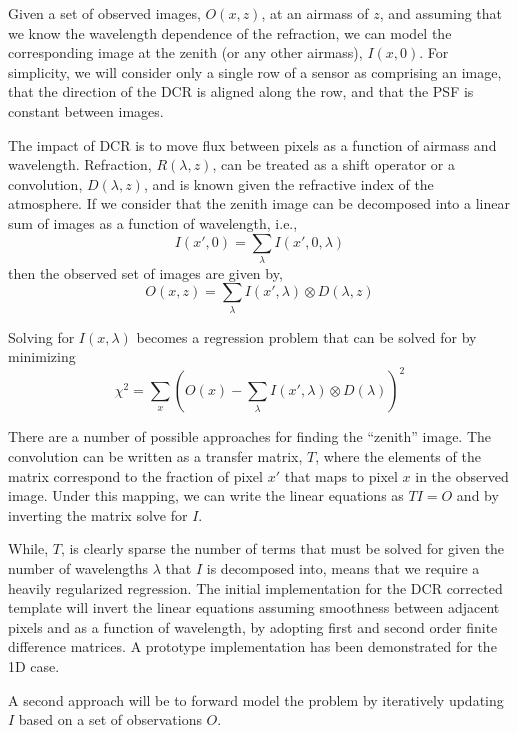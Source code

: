 Given a set of observed images, $O(x, z)$, at an airmass of $z$, and
assuming that we know the wavelength dependence of the refraction, we
can model the corresponding image at the zenith (or any other
airmass), $I(x, 0)$. For simplicity, we will consider only a single
row of a sensor as comprising an image, that the direction of the DCR
is aligned along the row, and that the PSF is constant between
images.

The impact of DCR is to move flux between pixels as a function of airmass and wavelength. Refraction, $R(\lambda, z)$, can be treated as a shift operator or a convolution, $D(\lambda, z)$, and is known given the refractive index of the atmosphere.  If we consider that the zenith image can be decomposed into a linear sum of images as a function of wavelength, i.e.,
\begin{equation}
I(x', 0) = \sum_\lambda I(x', 0, \lambda)
\end{equation}
then the observed set of images are given by,
\begin{equation}
O(x, z) = \sum_\lambda I(x',\lambda) \otimes D(\lambda, z)
\label{eq:convDCR}
\end{equation}

Solving for $I(x,\lambda)$ becomes a regression problem that can be
solved for by minimizing
\begin{equation}
\chi^2 = \sum_x (O(x) - \sum_\lambda I(x',\lambda) \otimes D(\lambda))^2
\end{equation}

There are a number of possible approaches for finding the ``zenith''
image.  The convolution can be written as a transfer matrix, $T$,
where the elements of the matrix correspond to the fraction of pixel $x'$ that maps to pixel $x$ in the observed image. Under this mapping, we can write the linear equations as $TI=O$ and by inverting the matrix solve for $I$.

While,  $T$, is clearly sparse the number of terms that must be solved for given the number of wavelengths $\lambda$ that $I$ is decomposed into, means that we require a heavily regularized regression. The initial implementation for the DCR corrected template will invert the linear equations assuming smoothness between adjacent pixels and as a function of wavelength, by adopting first and second
order finite difference matrices. %
A prototype implementation has been demonstrated for the 1D case.

A second approach will be to forward model the problem by iteratively updating
$I$ based on a set of observations $O$.

